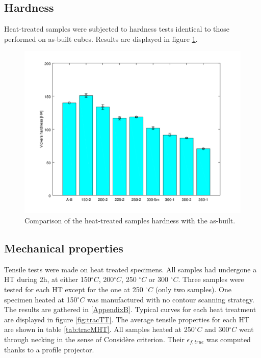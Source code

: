 \subsection{Hardness}

Heat-treated samples were subjected to hardness tests identical to those performed on as-built cubes. Results are displayed in figure \ref{fig:hardness}.

\begin{figure}[ht]
	\centering
	\centerline{\includegraphics[scale=0.6]{Images/hardness.png}}
	\decoRule
	\caption[Comparison of the heat-treated samples hardness with the as-built.]{Comparison of the heat-treated samples hardness with the as-built.}
	\label{fig:hardness}
\end{figure}


\subsection{Mechanical properties}

Tensile tests were made on heat treated specimens. All samples had undergone a HT during 2h, at either 150$^\circ C$, 200$^\circ C$, 250 $^\circ C$ or 300 $^\circ C$. Three samples were tested for each HT except for the one at 250 $^\circ C$ (only two samples). One specimen heated at 150$^\circ C$ was manufactured with no contour scanning strategy. The results are gathered in \ref{AppendixB}. Typical curves for each heat treatment are displayed in figure \ref{fig:tracTT}. The average tensile properties for each HT are shown in table \ref{tab:tracMHT}. All samples heated at 250$^\circ C$ and 300$^\circ C$ went through necking in the sense of Considère criterion. Their $\epsilon_{f,true}$ was computed thanks to a profile projector. \\

